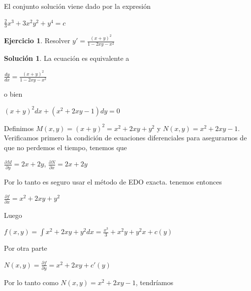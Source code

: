 \documentclass{article}
\theoremstyle{plain}
\theoremstyle{definition}
\newtheorem{ejer}[thm]{Ejercicio}
\newtheorem{sol}[thm]{Solución}
\begin{document}
El conjunto solución viene dado por la expresión

\begin{center}
$\displaystyle  \frac{2}{3}x^3+3x^2y^2 + y^4 =c$
\end{center}



\begin{ejer}Resolver $y'=\displaystyle \frac{(x+y)^2}{1-2xy-x^2}$ \\
\end{ejer}

\begin{sol}La ecuación es equivalente a
\end{sol}

\begin{center}
$\displaystyle \frac{dy}{dx} = \frac{(x+y)^2}{1-2xy-x^2}$
\end{center}

o bien


\begin{center}
$\displaystyle (x+y)^2dx +(x^2+2xy-1)dy = 0$
\end{center}


Definimos $M(x,y)= (x+y)^2=x^2+2xy+y^2$ y $N(x,y)= x^2+2xy-1$. Verificamos primero la condición de ecuaciones diferenciales para asegurarnos de que no perdemos el tiempo, tenemos que

\begin{center}
$\displaystyle \frac{\partial M}{\partial y}=  2x+2y$,  $\displaystyle \frac{\partial N}{\partial x}= 2x+2y$
\end{center}

Por lo tanto es seguro usar el método de EDO exacta. tenemos entonces

\begin{center}
$\displaystyle \frac{\partial f}{\partial x} = x^2+2xy+y^2$
\end{center}

Luego

\begin{center}
$f(x,y) = \displaystyle  \int x^2+2xy+y^2 dx =\frac{x^3}{3}+x^2y + y^2x	+ c(y)$
\end{center}

Por otra parte


\begin{center}
$N(x,y)= \displaystyle \frac{\partial f}{\partial y} = x^2+2xy+c'(y) $
\end{center}

Por lo tanto como $N(x,y)= x^2+2xy-1$, tendríamos
\end{document}
